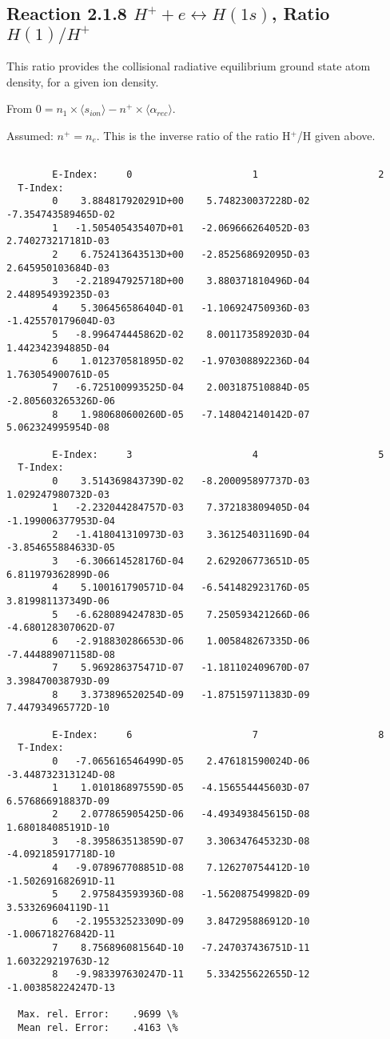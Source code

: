 \documentclass[12pt,dvipdfmx]{article}
\begin{document}
\subsection{
Reaction 2.1.8   $H^+ + e \leftrightarrow H(1s) $,  Ratio $H(1)/H^+$
}
This ratio provides the collisional radiative equilibrium ground state
atom density, for a given ion density.

From $0 = n_1 \times  \langle s_{ion} \rangle - n^+ \times \langle\alpha_{rec} \rangle$.

Assumed:  $n^+ = n_e$. This is the inverse ratio of the ratio H$^+$/H given
above.
\begin{small}\begin{verbatim}

        E-Index:     0                     1                     2
  T-Index:
        0    3.884817920291D+00    5.748230037228D-02   -7.354743589465D-02
        1   -1.505405435407D+01   -2.069666264052D-03    2.740273217181D-03
        2    6.752413643513D+00   -2.852568692095D-03    2.645950103684D-03
        3   -2.218947925718D+00    3.880371810496D-04    2.448954939235D-03
        4    5.306456586404D-01   -1.106924750936D-03   -1.425570179604D-03
        5   -8.996474445862D-02    8.001173589203D-04    1.442342394885D-04
        6    1.012370581895D-02   -1.970308892236D-04    1.763054900761D-05
        7   -6.725100993525D-04    2.003187510884D-05   -2.805603265326D-06
        8    1.980680600260D-05   -7.148042140142D-07    5.062324995954D-08

        E-Index:     3                     4                     5
  T-Index:
        0    3.514369843739D-02   -8.200095897737D-03    1.029247980732D-03
        1   -2.232044284757D-03    7.372183809405D-04   -1.199006377953D-04
        2   -1.418041310973D-03    3.361254031169D-04   -3.854655884633D-05
        3   -6.306614528176D-04    2.629206773651D-05    6.811979362899D-06
        4    5.100161790571D-04   -6.541482923176D-05    3.819981137349D-06
        5   -6.628089424783D-05    7.250593421266D-06   -4.680128307062D-07
        6   -2.918830286653D-06    1.005848267335D-06   -7.444889071158D-08
        7    5.969286375471D-07   -1.181102409670D-07    3.398470038793D-09
        8    3.373896520254D-09   -1.875159711383D-09    7.447934965772D-10

        E-Index:     6                     7                     8
  T-Index:
        0   -7.065616546499D-05    2.476181590024D-06   -3.448732313124D-08
        1    1.010186897559D-05   -4.156554445603D-07    6.576866918837D-09
        2    2.077865905425D-06   -4.493493845615D-08    1.680184085191D-10
        3   -8.395863513859D-07    3.306347645323D-08   -4.092185917718D-10
        4   -9.078967708851D-08    7.126270754412D-10   -1.502691682691D-11
        5    2.975843593936D-08   -1.562087549982D-09    3.533269604119D-11
        6   -2.195532523309D-09    3.847295886912D-10   -1.006718276842D-11
        7    8.756896081564D-10   -7.247037436751D-11    1.603229219763D-12
        8   -9.983397630247D-11    5.334255622655D-12   -1.003858224247D-13

  Max. rel. Error:    .9699 \%
  Mean rel. Error:    .4163 \%


\end{verbatim}\end{small}
\end{document}
